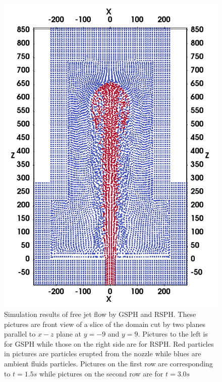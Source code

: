 \documentclass[review]{elsarticle}
\begin{document}
\begin{figure}[H]
\begin{minipage}[t]{.325\textwidth}
        \includegraphics[width=0.99 \textwidth]{./Figures/RSPH-t3-cutView}
    \end{minipage}%
    \caption{Simulation results of free jet flow by GSPH and RSPH. These pictures are front view of a slice of the domain cut by two planes parallel to $x-z$ plane at $y=-9$ and $y=9$. Pictures to the left is for GSPH while those on the right side are for RSPH. Red particles in pictures are particles erupted from the nozzle while blues are ambient fluids particles. Pictures on the first row are corresponding to $t=1.5s$ while pictures on the second row are for $t=3.0 s$}
    \label{fig:free-jet-comparison}
\end{figure}
\end{document}
